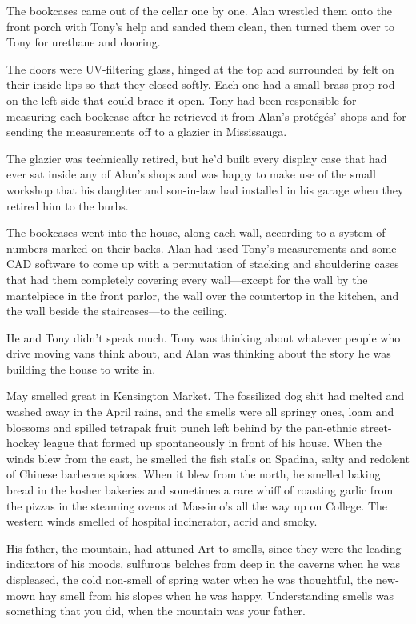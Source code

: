 The bookcases came out of the cellar one by one.  Alan wrestled them
onto the front porch with Tony's help and sanded them clean, then
turned them over to Tony for urethane and dooring.

The doors were UV-filtering glass, hinged at the top and surrounded by
felt on their inside lips so that they closed softly.  Each one had a
small brass prop-rod on the left side that could brace it open.  Tony
had been responsible for measuring each bookcase after he retrieved it
from Alan's prot\'{e}g\'{e}s' shops and for sending the measurements off
to a glazier in Mississauga.

The glazier was technically retired, but he'd built every display case
that had ever sat inside any of Alan's shops and was happy to make use
of the small workshop that his daughter and son-in-law had installed
in his garage when they retired him to the burbs.

The bookcases went into the house, along each wall, according to a
system of numbers marked on their backs.  Alan had used Tony's
measurements and some CAD software to come up with a permutation of
stacking and shouldering cases that had them completely covering every
wall---except for the wall by the mantelpiece in the front parlor, the
wall over the countertop in the kitchen, and the wall beside the
staircases---to the ceiling.

He and Tony didn't speak much.  Tony was thinking about whatever
people who drive moving vans think about, and Alan was thinking about
the story he was building the house to write in.

May smelled great in Kensington Market.  The fossilized dog shit had
melted and washed away in the April rains, and the smells were all
springy ones, loam and blossoms and spilled tetrapak fruit punch left
behind by the pan-ethnic street-hockey league that formed up
spontaneously in front of his house.  When the winds blew from the
east, he smelled the fish stalls on Spadina, salty and redolent of
Chinese barbecue spices.  When it blew from the north, he smelled
baking bread in the kosher bakeries and sometimes a rare whiff of
roasting garlic from the pizzas in the steaming ovens at Massimo's all
the way up on College.  The western winds smelled of hospital
incinerator, acrid and smoky.

His father, the mountain, had attuned Art to smells, since they were
the leading indicators of his moods, sulfurous belches from deep in
the caverns when he was displeased, the cold non-smell of spring water
when he was thoughtful, the new-mown hay smell from his slopes when he
was happy.  Understanding smells was something that you did, when the
mountain was your father.

